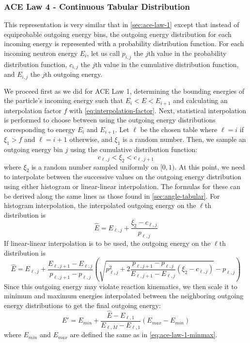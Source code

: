 \subsubsection{ACE Law 4 - Continuous Tabular Distribution}
\label{sec:ace-law-4}

This representation is very similar that in \autoref{sec:ace-law-1} except that
instead of equiprobable outgoing energy bins, the outgoing energy distribution
for each incoming energy is represented with a probability distribution
function. For each incoming neutron energy $E_i$, let us call $p_{i,j}$ the
$j$th value in the probability distribution function, $c_{i,j}$ the $j$th value
in the cumulative distribution function, and $E_{i,j}$ the $j$th outgoing
energy.

We proceed first as we did for ACE Law 1, determining the bounding energies of
the particle's incoming energy such that $E_i < E < E_{i+1}$ and calculating an
interpolation factor $f$ with \eqref{eq:interpolation-factor}. Next, statistical
interpolation is performed to choose between using the outgoing energy
distributions corresponding to energy $E_i$ and $E_{i+1}$. Let $\ell$ be the
chosen table where $\ell = i$ if $\xi_1 > f$ and $\ell = i + 1$ otherwise, and
$\xi_1$ is a random number. Then, we sample an outgoing energy bin $j$ using the
cumulative distribution function:
\begin{equation}
  \label{eq:ace-law-4-sample-cdf}
  c_{\ell,j} < \xi_2 < c_{\ell,j+1}
\end{equation}
where $\xi_2$ is a random number sampled uniformly on $[0,1)$. At this point, we
  need to interpolate between the successive values on the outgoing energy
  distribution using either histogram or linear-linear interpolation. The
  formulas for these can be derived along the same lines as those found in
  \autoref{sec:angle-tabular}. For histogram interpolation, the interpolated
  outgoing energy on the $\ell$th distribution is
\begin{equation}
  \label{eq:energy-histogram}
  \hat{E} = E_{\ell,j} + \frac{\xi_2 - c_{\ell,j}}{p_{\ell,j}}
\end{equation}
If linear-linear interpolation is to be used, the outgoing energy on the
$\ell$th distribution is
\begin{equation}
  \label{eq:energy-linlin}
  \hat{E} = E_{\ell,j} + \frac{E_{\ell,j+1} - E_{\ell,j}}{p_{\ell,j+1} -
    p_{\ell,j}} \left ( \sqrt{p_{\ell,j}^2 + 2 \frac{p_{\ell,j+1} -
      p_{\ell,j}}{E_{\ell,j+1} - E_{\ell,j}} ( \xi_2 - c_{\ell,j} )} -
  p_{\ell,j} \right )
\end{equation}
Since this outgoing energy may violate reaction kinematics, we then scale it to
minimum and maximum energies interpolated between the neighboring outgoing
energy distributions to get the final outgoing energy:
\begin{equation}
  \label{eq:ace-law-4-energy}
  E' = E_{min} + \frac{\hat{E} - E_{\ell,1}}{E_{\ell,M} - E_{\ell,1}}
  (E_{max} - E_{min})
\end{equation}
where $E_{min}$ and $E_{max}$ are defined the same as in
\eqref{eq:ace-law-1-minmax}.

